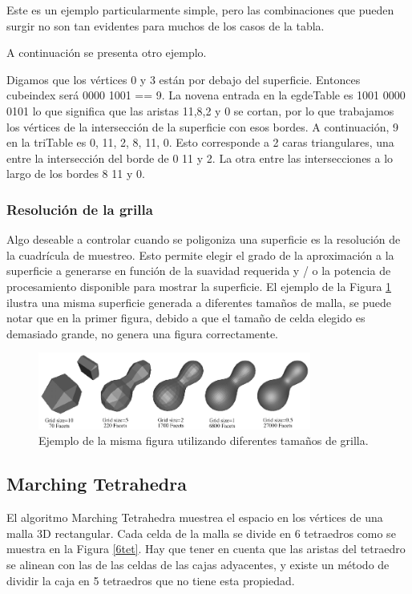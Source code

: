 \documentclass[12pt]{article}
\begin{document}
Este es un ejemplo particularmente simple, pero las combinaciones que pueden surgir no son tan evidentes para muchos de los casos de la tabla.

A continuación se presenta otro ejemplo.

Digamos que los vértices 0 y 3 están por debajo del superficie. Entonces cubeindex será 0000 1001 == 9. La novena entrada en la egdeTable es 1001 0000 0101 lo que significa que las aristas 11,8,2 y 0 se cortan, por lo que trabajamos los vértices de la intersección de la superficie con esos bordes.
A continuación, 9 en la triTable es 0, 11, 2, 8, 11, 0. Esto corresponde a 2 caras triangulares, una entre la intersección del borde de 0 11 y 2. La otra entre las intersecciones a lo largo de los bordes 8 11 y 0.
\subsubsection{Resolución de la grilla}
Algo deseable a controlar cuando se poligoniza una superficie es la resolución de la cuadrícula de muestreo. Esto permite elegir el grado de la aproximación a la superficie a generarse en función de la suavidad requerida y / o la potencia de procesamiento disponible para mostrar la superficie. El ejemplo de la Figura \ref{mani} ilustra una misma superficie generada a diferentes tamaños de malla, se puede notar que en la primer figura, debido a que el tamaño de celda elegido es demasiado grande, no genera una figura correctamente.
\clearpage
\begin{figure}[h!]
\includegraphics[width=0.8\textwidth,center]{marchingcubes4.png}
\caption{Ejemplo de la misma figura utilizando diferentes tamaños de grilla.}
\label{mani}
\end{figure}

\subsection{Marching Tetrahedra}
El algoritmo Marching Tetrahedra\cite{marching}\cite{marchingt} muestrea el espacio en los vértices de una malla 3D rectangular. Cada celda de la malla se divide en 6 tetraedros como se muestra en la Figura \ref{6tet}. Hay que tener en cuenta que las aristas del tetraedro se alinean con las de las celdas de las cajas adyacentes, y existe un método de dividir la caja en 5 tetraedros que no tiene esta propiedad.
\end{document}
